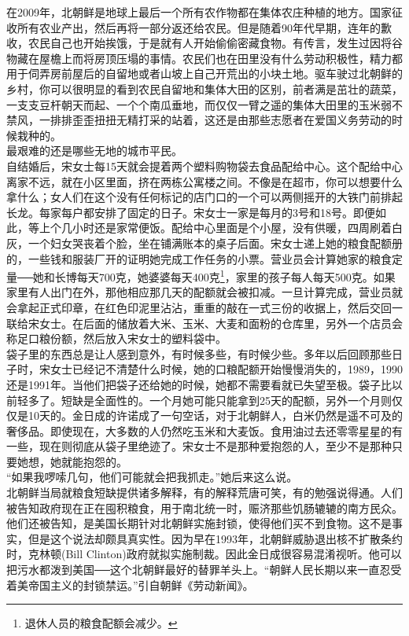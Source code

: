 \begin{multicols}{\theparacolNo}
在2009年，北朝鲜是地球上最后一个所有农作物都在集体农庄种植的地方。国家征收所有农业产出，然后再将一部分返还给农民。但是随着90年代早期，连年的歉收，农民自己也开始挨饿，于是就有人开始偷偷密藏食物。有传言，发生过因将谷物藏在屋檐上而将房顶压塌的事情。农民们也在田里没有什么劳动积极性，精力都用于伺弄房前屋后的自留地或者山坡上自己开荒出的小块土地。驱车驶过北朝鲜的乡村，你可以很明显的看到农民自留地和集体大田的区别，前者满是茁壮的蔬菜，一支支豆杆朝天而起、一个个南瓜垂地，而仅仅一臂之遥的集体大田里的玉米弱不禁风，一排排歪歪扭扭无精打采的站着，这还是由那些志愿者在爱国义务劳动的时候栽种的。\\

最艰难的还是哪些无地的城市平民。\\

自结婚后，宋女士每15天就会提着两个塑料购物袋去食品配给中心。这个配给中心离家不远，就在小区里面，挤在两栋公寓楼之间。不像是在超市，你可以想要什么拿什么；女人们在这个没有任何标记的店门口的一个可以两侧摇开的大铁门前排起长龙。每家每户都安排了固定的日子。宋女士一家是每月的3号和18号。即便如此，等上个几小时还是家常便饭。配给中心里面是个小屋，没有供暖，四周刷着白灰，一个妇女哭丧着个脸，坐在铺满账本的桌子后面。宋女士递上她的粮食配额册的，一些钱和服装厂开的证明她完成工作任务的小票。营业员会计算她家的粮食定量──她和长博每天700克，她婆婆每天400克\footnote{退休人员的粮食配额会减少。}，家里的孩子每人每天500克。如果家里有人出门在外，那他相应那几天的配额就会被扣减。一旦计算完成，营业员就会拿起正式印章，在红色印泥里沾沾，重重的敲在一式三份的收据上，然后交回一联给宋女士。在后面的储放着大米、玉米、大麦和面粉的仓库里，另外一个店员会称足口粮份额，然后放入宋女士的塑料袋中。\\

袋子里的东西总是让人感到意外，有时候多些，有时候少些。多年以后回顾那些日子时，宋女士已经记不清楚什么时候，她的口粮配额开始慢慢消失的，1989，1990还是1991年。当他们把袋子还给她的时候，她都不需要看就已失望至极。袋子比以前轻多了。短缺是全面性的。一个月她可能只能拿到25天的配额，另外一个月则仅仅是10天的。金日成的许诺成了一句空话，对于北朝鲜人，白米仍然是遥不可及的奢侈品。即使现在，大多数的人仍然吃玉米和大麦饭。食用油过去还零零星星的有一些，现在则彻底从袋子里绝迹了。宋女士不是那种爱抱怨的人，至少不是那种只要她想，她就能抱怨的。\\

“如果我啰嗦几句，他们可能就会把我抓走。”她后来这么说。\\

北朝鲜当局就粮食短缺提供诸多解释，有的解释荒唐可笑，有的勉强说得通。人们被告知政府现在正在囤积粮食，用于南北统一时，赈济那些饥肠辘辘的南方民众。他们还被告知，是美国长期针对北朝鲜实施封锁，使得他们买不到食物。这不是事实，但是这个说法却颇具真实性。因为早在1993年，北朝鲜威胁退出核不扩散条约时，克林顿(Bill Clinton)政府就拟实施制裁。因此金日成很容易混淆视听。他可以把污水都泼到美国──这个北朝鲜最好的替罪羊头上。“朝鲜人民长期以来一直忍受着美帝国主义的封锁禁运。”引自朝鲜《劳动新闻》。\\


\end{multicols}
